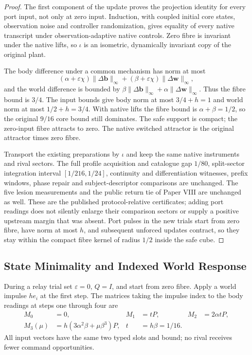 \documentclass[11pt,a4paper]{article}
\theoremstyle{definition}
\begin{document}
\begin{proof}
The first component of the update proves the projection identity for every port input, not only at zero input. Induction, with coupled initial core states, observation noise and controller randomization, gives equality of every native transcript under observation-adaptive native controls. Zero fibre is invariant under the native lifts, so $\iota$ is an isometric, dynamically invariant copy of the original plant.

The body difference under a common mechanism has norm at most
\[
 (\alpha+\varepsilon\chi)\|\Delta\mathbf b\|_\infty
 +(\beta+\varepsilon\chi)\|\Delta\mathbf w\|_\infty,
\]
and the world difference is bounded by $\beta\|\Delta\mathbf b\|_\infty+\alpha\|\Delta\mathbf w\|_\infty$. Thus the fibre bound is $3/4$. The input bounds give body norm at most $3/4+h=1$ and world norm at most $1/2+h=3/4$. With native lifts the fibre bound is $\alpha+\beta=1/2$, so the original $9/16$ core bound still dominates. The safe support is compact; the zero-input fibre attracts to zero. The native switched attractor is the original attractor times zero fibre.

Transport the existing preparations by $\iota$ and keep the same native instruments and rival sectors. The full profile acquisition and catalogue gap $1/80$, split-sector integration interval $[1/216,1/24]$, continuity and differentiation witnesses, prefix windows, phase repair and subject-descriptor comparisons are unchanged. The five lesion measurements and the public return tie of Paper VIII are unchanged as well. These are the published protocol-relative certificates; adding port readings does not silently enlarge their comparison sectors or supply a positive upstream margin that was absent. Port pulses in the new trials start from zero fibre, have norm at most $h$, and subsequent unforced updates contract, so they stay within the compact fibre kernel of radius $1/2$ inside the safe cube.
\end{proof}

\subsection{State Minimality and Indexed World Response}

During a relay trial set $\varepsilon=0$, $Q=I$, and start from zero fibre. Apply a world impulse $h e_i$ at the first step. The matrices taking the impulse index to the body readings at steps one through four are
\begin{align*}
 M_0&=0,& M_1&=tP,& M_2&=2\alpha tP,\\
 M_3(\mu)&=h(3\alpha^2\beta+\mu\beta^3)P,
 &t&=h\beta=1/16.
\end{align*}
All input vectors have the same two typed slots and bound; no rival receives fewer command opportunities.
\end{document}
